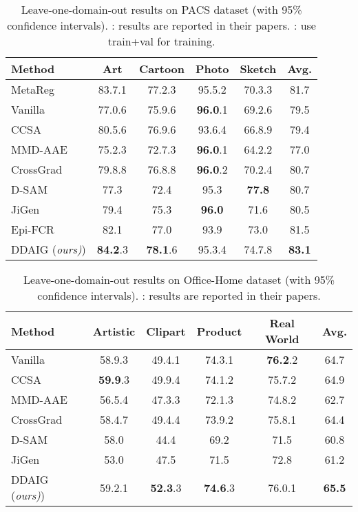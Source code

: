 \documentclass[letterpaper]{article}
\newcommand{\tableCellHeight}{1.1}
\begin{document}
\begin{table}[t]
\setlength{\tabcolsep}{4pt}
\renewcommand{\arraystretch}{\tableCellHeight}
\centering
\footnotesize
\caption{Leave-one-domain-out results on PACS dataset (with 95\% confidence intervals). : results are reported in their papers. : use train+val for training.}
\label{tab:resOnPACS}
\begin{tabular}{l | c c c c | c}
\hline
Method & Art & Cartoon & Photo & Sketch & Avg. \\ \hline
MetaReg & 83.7.1 & 77.2.3 & 95.5.2 & 70.3.3 & 81.7 \\ \hline
Vanilla & 77.0.6 & 75.9.6 & \textbf{96.0}.1 & 69.2.6 & 79.5  \\
CCSA & 80.5.6 & 76.9.6 & 93.6.4 & 66.8.9 & 79.4 \\
MMD-AAE & 75.2.3 & 72.7.3 & \textbf{96.0}.1 & 64.2.2 & 77.0 \\
CrossGrad & 79.8.8 & 76.8.8 & \textbf{96.0}.2 & 70.2.4 & 80.7 \\
D-SAM & 77.3 & 72.4 & {95.3} & \textbf{77.8} & 80.7 \\
JiGen & 79.4 & 75.3 & \textbf{96.0} & 71.6 & 80.5 \\
Epi-FCR & {82.1} & {77.0} & 93.9 & 73.0 & {81.5} \\
DDAIG (\emph{ours)}) & \textbf{84.2}.3 & \textbf{78.1}.6 & {95.3}.4 & {74.7}.8 & \textbf{83.1} \\
\hline
\end{tabular}
\vspace{-0.1cm}
\end{table}

\begin{table}[t]
\setlength{\tabcolsep}{3pt}
\renewcommand{\arraystretch}{\tableCellHeight}
\centering
\footnotesize
\caption{Leave-one-domain-out results on Office-Home dataset (with 95\% confidence intervals). : results are reported in their papers.}
\label{tab:resOnOfficeHome}
\begin{tabular}{l | c c c c | c}
\hline
Method & Artistic & Clipart & Product & Real World & Avg. \\ \hline
Vanilla & 58.9.3 & 49.4.1 & {74.3}.1 & \textbf{76.2}.2 & 64.7  \\
CCSA & \textbf{59.9}.3 & {49.9}.4 & 74.1.2 & 75.7.2 & {64.9} \\
MMD-AAE & 56.5.4 & 47.3.3 & 72.1.3 & 74.8.2 & 62.7  \\
CrossGrad & 58.4.7 & 49.4.4 & 73.9.2 & 75.8.1 & 64.4 \\
D-SAM & 58.0 & 44.4 & 69.2 & 71.5 & 60.8 \\
JiGen & 53.0 & 47.5 & 71.5 & 72.8 & 61.2 \\
DDAIG (\emph{ours)}) & {59.2}.1 & \textbf{52.3}.3 & \textbf{74.6}.3 & {76.0}.1 & \textbf{65.5} \\
\hline
\end{tabular}
\vspace{-0.4cm}
\end{table}
\end{document}
